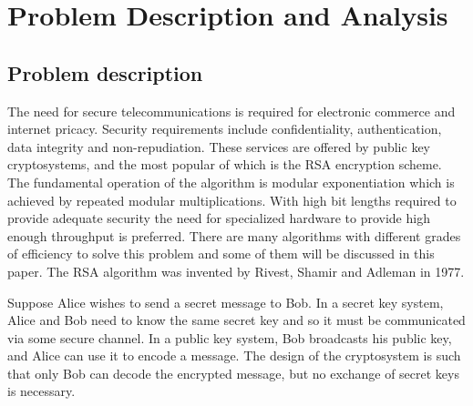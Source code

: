 \section{Problem Description and Analysis}
%
%
\subsection{Problem description}\label{sec:problemDescription}
The need for secure telecommunications is required for electronic commerce and internet pricacy. Security requirements include confidentiality, authentication, data integrity and non-repudiation. 
These services are offered by public key cryptosystems, and the most popular of which is the RSA encryption scheme.
The fundamental operation of the algorithm is modular exponentiation which is achieved by repeated modular multiplications. 
With high bit lengths required to provide adequate security the need for specialized hardware to provide high enough throughput is preferred. 
There are many algorithms with different grades of efficiency to solve this problem and some of them will be discussed in this paper.
The RSA algorithm was invented by Rivest, Shamir and Adleman in 1977. 

Suppose Alice wishes to send a secret message to Bob. 
In a secret key system, Alice and Bob need to know the same secret key and so it must be communicated via some secure channel. 
In a public key system, Bob broadcasts his public key, and Alice can use it to encode a message. 
The design of the cryptosystem is such that only Bob can decode the encrypted message, but no exchange of secret keys is necessary. 

